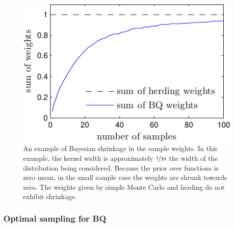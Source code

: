 \begin{figure}
\centering
\includegraphics[width=\columnwidth]{figs/herding/weights_shrinkage}
\caption{An example of Bayesian shrinkage in the sample weights.  In this example, the kernel width is approximately $\nicefrac{1}{20}$ the width of the distribution being considered.  Because the prior over functions is zero mean, in the small sample case the weights are shrunk towards zero.  The weights given by simple Monte Carlo and herding do not exhibit shrinkage. }
\label{fig:weights_shrinkage}
\end{figure}



\subsubsection{Optimal sampling for BQ}

